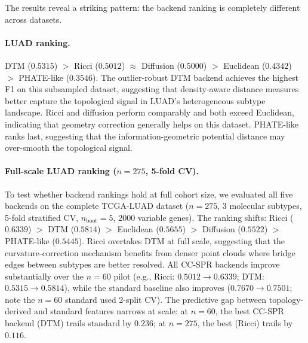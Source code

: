 \documentclass[11pt]{article}
\begin{document}
The results reveal a striking pattern: the backend ranking is completely different across datasets.

\paragraph{LUAD ranking.}
DTM ($0.5315$) $>$ Ricci ($0.5012$) $\approx$ Diffusion ($0.5000$) $>$ Euclidean ($0.4342$) $>$ PHATE-like ($0.3546$).
The outlier-robust DTM backend achieves the highest F1 on this subsampled dataset, suggesting that density-aware distance measures better capture the topological signal in LUAD's heterogeneous subtype landscape.
Ricci and diffusion perform comparably and both exceed Euclidean, indicating that geometry correction generally helps on this dataset.
PHATE-like ranks last, suggesting that the information-geometric potential distance may over-smooth the topological signal.

\paragraph{Full-scale LUAD ranking ($n = 275$, 5-fold CV).}
To test whether backend rankings hold at full cohort size, we evaluated all five backends on the complete TCGA-LUAD dataset ($n = 275$, 3 molecular subtypes, 5-fold stratified CV, $n_{\text{boot}} = 5$, 2000 variable genes).
The ranking shifts: Ricci ($0.6339$) $>$ DTM ($0.5814$) $>$ Euclidean ($0.5655$) $>$ Diffusion ($0.5522$) $>$ PHATE-like ($0.5445$).
Ricci overtakes DTM at full scale, suggesting that the curvature-correction mechanism benefits from denser point clouds where bridge edges between subtypes are better resolved.
All CC-SPR backends improve substantially over the $n = 60$ pilot (e.g., Ricci: $0.5012 \to 0.6339$; DTM: $0.5315 \to 0.5814$), while the standard baseline also improves ($0.7670 \to 0.7501$; note the $n = 60$ standard used 2-split CV).
The predictive gap between topology-derived and standard features narrows at scale: at $n = 60$, the best CC-SPR backend (DTM) trails standard by $0.236$; at $n = 275$, the best (Ricci) trails by $0.116$.
\end{document}
